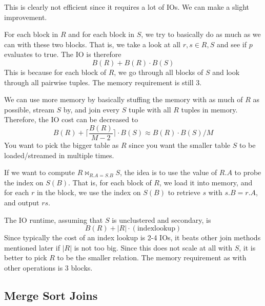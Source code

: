 \documentclass{article}
\begin{document}
    This is clearly not efficient since it requires a lot of IOs. We can make a slight improvement. 

    \begin{definition}
      For each block in $R$ and for each block in $S$, we try to basically do as much as we can with these two blocks. That is, we take a look at all $r, s \in R, S$ and see if $p$ evaluates to true. The IO is therefore 
      \begin{equation}
        B(R) + B(R) \cdot B(S)
      \end{equation}
      This is because for each block of $R$, we go through all blocks of $S$ and look through all pairwise tuples. The memory requirement is still $3$. 
    \end{definition}

    We can use more memory by basically stuffing the memory with as much of $R$ as possible, stream $S$ by, and join every $S$ tuple with all $R$ tuples in memory. Therefore, the IO cost can be decreased to 
    \begin{equation}
      B(R) + \bigg\lceil \frac{B(R)}{M-2} \bigg\rceil \cdot B(S) \approx B(R) \cdot B(S) / M
    \end{equation}
    You want to pick the bigger table as $R$ since you want the smaller table $S$ to be loaded/streamed in multiple times. 

    \begin{definition}
      If we want to compute $R \bowtie_{R.A = S.B} S$, the idea is to use the value of $R.A$ to probe the index on $S(B)$. That is, for each block of $R$, we load it into memory, and for each $r$ in the block, we use the index on $S(B)$ to retrieve $s$ with $s.B = r.A$, and output $rs$. 

      The IO runtime, assuming that $S$ is unclustered and secondary, is 
      \begin{equation}
        B(R) + |R| \cdot (\mathrm{index lookup}) 
      \end{equation}
      Since typically the cost of an index lookup is 2-4 IOs, it beats other join methods mentioned later if $|R|$ is not too big. Since this does not scale at all with $S$, it is better to pick $R$ to be the smaller relation. The memory requirement as with other operations is $3$ blocks. 
    \end{definition}

  \subsection{Merge Sort Joins}
\end{document}
